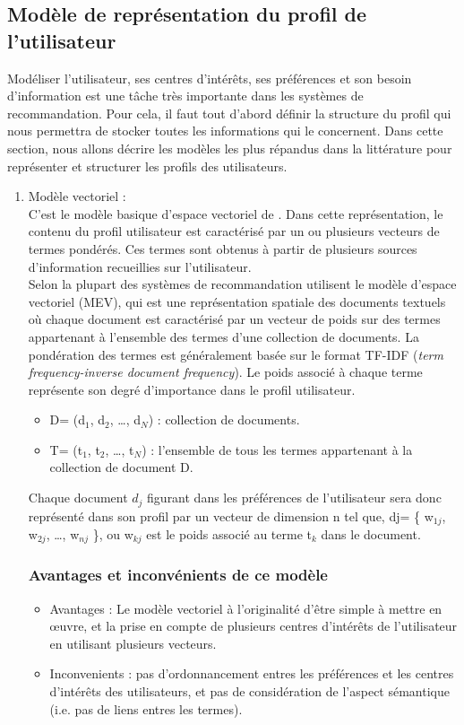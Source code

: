 \documentclass[a4paper,12pt,letterpaper,headsepline,singlespacing,headsepline, french]{report}
\begin{document}
\subsection{Modèle de représentation du profil de l’utilisateur}
Modéliser l’utilisateur, ses centres d’intérêts, ses préférences et son besoin d’information est une tâche très importante dans les systèmes de recommandation. Pour cela, il faut tout d’abord définir la structure du profil qui nous permettra de stocker toutes les informations qui le concernent. Dans cette section, nous allons décrire les modèles les plus répandus dans la littérature pour représenter et structurer les profils des utilisateurs.

\begin{enumerate}
	\item Modèle vectoriel :\\
	C’est le modèle basique d’espace vectoriel de \cite{ref24}. Dans cette représentation, le contenu du profil utilisateur est caractérisé par un ou plusieurs vecteurs de termes pondérés. Ces termes sont obtenus à partir de plusieurs sources d’information recueillies sur l’utilisateur.\\
	Selon \cite{ref25} la plupart des systèmes de recommandation utilisent le modèle d’espace vectoriel (MEV), qui est une représentation spatiale des documents textuels où chaque document est caractérisé par un vecteur de poids sur des termes appartenant à l’ensemble des termes d’une collection de documents. La pondération des termes est généralement basée sur le format TF-IDF (\textit{term frequency-inverse document frequency}). Le poids associé à chaque terme représente son degré d’importance dans le profil utilisateur. 
	
	\begin{itemize}
		\item 	D= (d$_{1}$, d$_{2}$, …, d$_{N}$) : collection de documents.
		\item 	T= (t$_{1}$, t$_{2}$, …, t$_{N}$) : l’ensemble de tous les termes appartenant à la collection de document D. 
	\end{itemize}
	Chaque document $d_{j}$ figurant dans les préférences de l’utilisateur sera donc représenté dans son profil par un vecteur de dimension n tel que, dj= \{ w$_{1j}$, w$_{2j}$, …, w$_{nj}$ \}, ou w$_{kj}$ est le poids associé au terme t$_{k}$ dans le document.
			
	
	
 \subsubsection{ Avantages et inconvénients de ce modèle  \cite{ref27}}
\begin{itemize}
	\item  Avantages : Le modèle vectoriel à l’originalité d’être simple à mettre en œuvre, et la prise en compte de plusieurs centres d’intérêts de l’utilisateur en utilisant plusieurs vecteurs.  
	\item  Inconvenients : pas d’ordonnancement entres les préférences et les centres d’intérêts des utilisateurs, et pas de considération de l’aspect sémantique (i.e. pas de liens entres les termes).
\end{itemize}



\end{enumerate}
\end{document}
